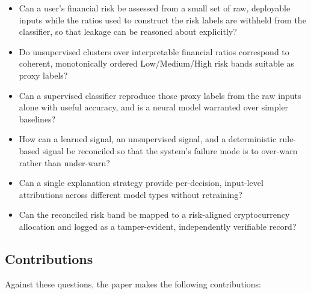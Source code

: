 \begin{itemize}
\item[\textbf{RQ1.}] Can a user's financial risk be assessed from a small set of raw,
  deployable inputs while the ratios used to construct the risk labels are withheld
  from the classifier, so that leakage can be reasoned about explicitly?
\item[\textbf{RQ2.}] Do unsupervised clusters over interpretable financial ratios
  correspond to coherent, monotonically ordered Low/Medium/High risk bands suitable as
  proxy labels?
\item[\textbf{RQ3.}] Can a supervised classifier reproduce those proxy labels from the
  raw inputs alone with useful accuracy, and is a neural model warranted over simpler
  baselines?
\item[\textbf{RQ4.}] How can a learned signal, an unsupervised signal, and a
  deterministic rule-based signal be reconciled so that the system's failure mode is to
  over-warn rather than under-warn?
\item[\textbf{RQ5.}] Can a single explanation strategy provide per-decision,
  input-level attributions across different model types without retraining?
\item[\textbf{RQ6.}] Can the reconciled risk band be mapped to a risk-aligned
  cryptocurrency allocation and logged as a tamper-evident, independently verifiable
  record?
\end{itemize}

\subsection{Contributions}\label{subsec:contributions}
Against these questions, the paper makes the following contributions:

